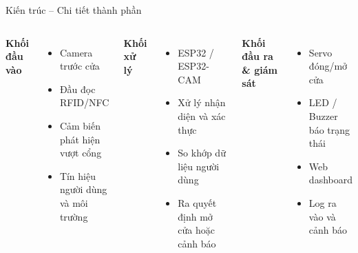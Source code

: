 \documentclass[aspectratio=169]{beamer}
\begin{document}
\begin{frame}{Kiến trúc -- Chi tiết thành phần}
  \begin{columns}[T]
      \textbf{Khối đầu vào}
      \begin{itemize}
        \item Camera trước cửa
        \item Đầu đọc RFID/NFC
        \item Cảm biến phát hiện vượt cổng
        \item Tín hiệu người dùng và môi trường
      \end{itemize}

      \textbf{Khối xử lý}
      \begin{itemize}
        \item ESP32 / ESP32-CAM
        \item Xử lý nhận diện và xác thực
        \item So khớp dữ liệu người dùng
        \item Ra quyết định mở cửa hoặc cảnh báo
      \end{itemize}

      \textbf{Khối đầu ra \& giám sát}
      \begin{itemize}
        \item Servo đóng/mở cửa
        \item LED / Buzzer báo trạng thái
        \item Web dashboard
        \item Log ra vào và cảnh báo
      \end{itemize}
  \end{columns}
\end{frame}
\end{document}
